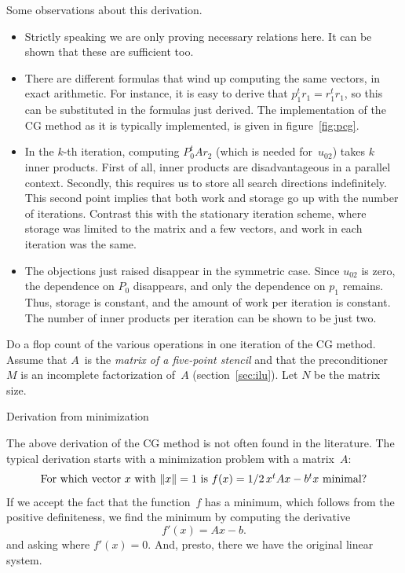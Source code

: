 Some observations about this derivation.
\begin{itemize}
\item Strictly speaking we are only proving necessary
  relations here. It can be shown that these are sufficient too.
\item There are different formulas that wind up computing the same
  vectors, in exact arithmetic. For instance, it is easy to derive
  that $p_1^tr_1=r_1^tr_1$, so this can be substituted in the formulas
  just derived. The implementation of the \ac{CG} method as it is
  typically implemented, is given in figure~\ref{fig:pcg}.
\item In the $k$-th iteration, computing $P_0^tAr_2$ (which is needed
  for~$u_{02}$) takes $k$ inner products. First of all, inner products
  are disadvantageous in a parallel context. Secondly, this requires
  us to store all search directions indefinitely. This second point
  implies that both work
  and storage go up with the number of iterations. Contrast this with
  the stationary iteration scheme, where storage was limited to the
  matrix and a few vectors, and work in each iteration was the same.
\item The objections just raised disappear in the symmetric
  case. Since $u_{02}$ is zero, the dependence on $P_0$ disappears,
  and only the dependence on $p_1$ remains. Thus, storage is constant,
  and the amount of work per iteration is constant. The number of
  inner products per iteration can be shown to be just two.
\end{itemize}



\begin{exercise}
  Do a flop count of the various operations in one iteration of the
  \ac{CG} method. Assume that $A$~is the
  \emph{matrix of a five-point
    stencil}
  and that the preconditioner $M$ is an incomplete
  factorization of~$A$ (section~\ref{sec:ilu}). Let $N$ be the matrix size.
\end{exercise}


 {Derivation from minimization}

The above derivation of the \ac{CG} method is not often found in the
literature. The typical derivation starts with a minimization problem
with a  matrix~$A$:
\begin{equation}
  \hbox{For which vector $x$ with $\|x\|=1$ is $f(x)=1/2\, x^tAx-b^tx$ minimal?}
\end{equation}
If we accept the fact that the function~$f$ has a minimum, which
follows from the positive definiteness, we find the minimum by
computing the derivative
\[ f'(x) = Ax-b. \]
and asking where $f'(x)=0$. And, presto, there we have the original
linear system.

